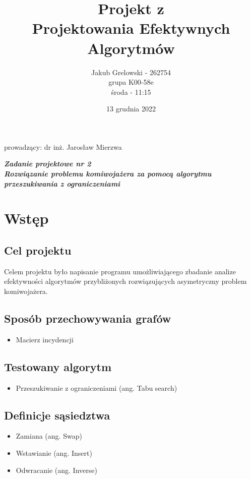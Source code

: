 \documentclass{article}
\title{\vspace{4cm} \textbf{Projekt z \\ Projektowania Efektywnych Algorytmów}}
\author{Jakub Grelowski - 262754 \\
        grupa K00-58e \\
        środa - 11:15}
\date{13 grudnia 2022}
\begin{document}
\maketitle

\begin{center}

\large prowadzący: dr inż. Jarosław Mierzwa 

\vspace{1cm}

\Large \textbf{\textit{Zadanie projektowe nr 2 \\ \vspace{1cm} Rozwiązanie problemu komiwojażera za pomocą algorytmu przeszukiwania z ograniczeniami}}     
\end{center}

\vspace{1cm}

\newpage

\tableofcontents

\newpage

\section{Wstęp}
\subsection{Cel projektu}
Celem projektu było napisanie programu umożliwiającego zbadanie analize efektywności algorytmów przybliżonych rozwiązujących asymetryczny problem komiwojażera. 

\subsection{Sposób przechowywania grafów}
\begin{itemize}
    \item Macierz incydencji
\end{itemize}
\subsection{Testowany algorytm}
\begin{itemize}
    \item Przeszukiwanie z ograniczeniami (ang. Tabu search)
\end{itemize}
\subsection{Definicje sąsiedztwa}
\begin{itemize}
    \item Zamiana (ang. Swap)
    \item Wstawianie (ang. Insert)
    \item Odwracanie (ang. Inverse)
\end{itemize}
\end{document}
